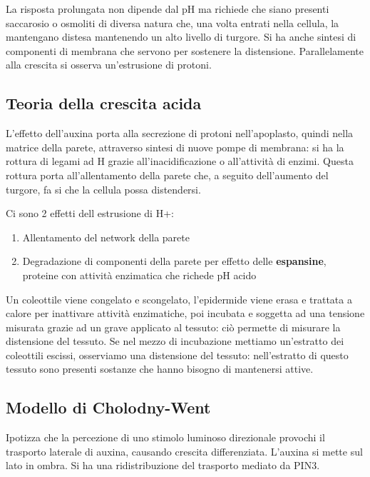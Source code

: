 \documentclass[a4paper,12pt]{book}
\begin{document}
La risposta prolungata non dipende dal pH ma richiede che siano presenti saccarosio o osmoliti di diversa natura che, una volta entrati nella cellula, la mantengano distesa mantenendo un alto livello di turgore. Si ha anche sintesi di componenti di membrana che servono per sostenere la distensione. Parallelamente alla crescita si osserva un'estrusione di protoni.

\subsection{Teoria della crescita acida}
L'effetto dell'auxina porta alla secrezione di protoni nell'apoplasto, quindi nella matrice della parete, attraverso sintesi di nuove pompe di membrana: si ha la rottura di legami ad H  grazie all'inacidificazione o all'attività di enzimi. Questa rottura porta all'allentamento della parete che, a seguito dell'aumento del turgore, fa si che la cellula possa distendersi.

Ci sono 2 effetti dell estrusione di H+:
\begin{enumerate}
\item{Allentamento del network della parete}
\item{Degradazione di componenti della parete per effetto delle \textbf{espansine}, proteine con attività enzimatica che richede pH acido}
\end{enumerate}

Un coleottile viene congelato e scongelato, l'epidermide viene erasa e trattata a calore per inattivare attività enzimatiche, poi incubata e soggetta ad una tensione misurata grazie ad un grave applicato al tessuto: ciò permette di misurare la distensione del tessuto. Se nel mezzo di incubazione mettiamo un'estratto dei coleottili escissi, osserviamo una distensione del tessuto: nell'estratto di questo tessuto sono presenti sostanze che hanno bisogno di mantenersi attive.

\subsection{Modello di Cholodny-Went}
Ipotizza che la percezione di uno stimolo luminoso direzionale provochi il trasporto laterale di auxina, causando crescita differenziata. L'auxina si mette sul lato in ombra. Si ha una ridistribuzione del trasporto mediato da PIN3. 
\end{document}
